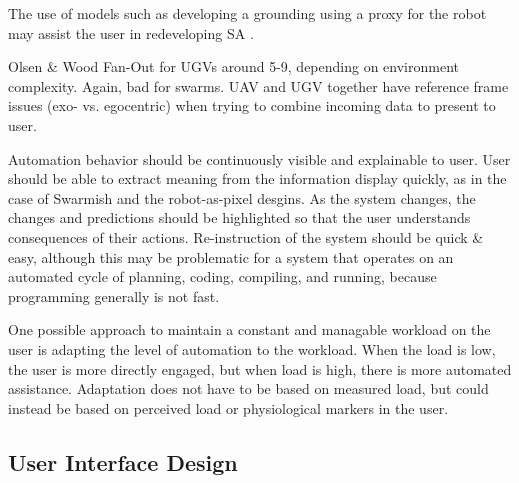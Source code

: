 \documentclass[]{article}
\begin{document}
The use of models such as developing a grounding using a proxy for the robot may assist the user in redeveloping SA \cite{stubbs2008using}. 


Olsen \& Wood Fan-Out for UGVs around 5-9, depending on environment complexity. Again, bad for swarms. UAV and UGV together have reference frame issues (exo- vs. egocentric) when trying to combine incoming data to present to user. 

Automation behavior should be continuously visible and explainable to user. 
User should be able to extract meaning from the information display quickly, as in the case of Swarmish and the robot-as-pixel desgins.
As the system changes, the changes and predictions should be highlighted so that the user understands consequences of their actions. 
Re-instruction of the system should be quick \& easy, although this may be problematic for a system that operates on an automated cycle of planning, coding, compiling, and running, because programming generally is not fast.

One possible approach to maintain a constant and managable workload on the user is adapting the level of automation to the workload. 
When the load is low, the user is more directly engaged, but when load is high, there is more automated assistance. 
Adaptation does not have to be based on measured load, but could instead be based on perceived load or physiological markers in the user. 


\subsection{User Interface Design}
\end{document}
